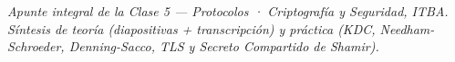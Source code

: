\documentclass[11pt,a4paper]{article}
\begin{document}
\vfill
\begin{center}\small\itshape\color{black!60}
Apunte integral de la Clase 5 — Protocolos · Criptografía y Seguridad, ITBA.\\
Síntesis de teoría (diapositivas + transcripción) y práctica (KDC, Needham-Schroeder,
Denning-Sacco, TLS y Secreto Compartido de Shamir).
\end{center}
\end{document}
